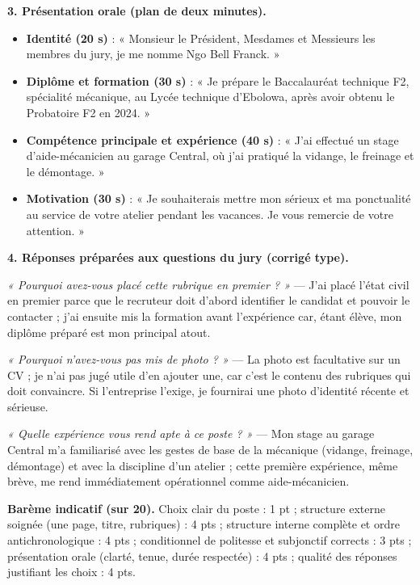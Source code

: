 \documentclass[11pt]{article}
\begin{document}
\begin{corrige}
\textbf{3. Présentation orale (plan de deux minutes).}
\begin{itemize}
\item \textbf{Identité (20 s)} : « Monsieur le Président, Mesdames et Messieurs les membres du jury, je me nomme Ngo Bell Franck. »
\item \textbf{Diplôme et formation (30 s)} : « Je prépare le Baccalauréat technique F2, spécialité mécanique, au Lycée technique d'Ebolowa, après avoir obtenu le Probatoire F2 en 2024. »
\item \textbf{Compétence principale et expérience (40 s)} : « J'ai effectué un stage d'aide-mécanicien au garage Central, où j'ai pratiqué la vidange, le freinage et le démontage. »
\item \textbf{Motivation (30 s)} : « Je souhaiterais mettre mon sérieux et ma ponctualité au service de votre atelier pendant les vacances. Je vous remercie de votre attention. »
\end{itemize}

\textbf{4. Réponses préparées aux questions du jury (corrigé type).}

\emph{« Pourquoi avez-vous placé cette rubrique en premier ? »} — J'ai placé l'état civil en premier parce que le recruteur doit d'abord identifier le candidat et pouvoir le contacter ; j'ai ensuite mis la formation avant l'expérience car, étant élève, mon diplôme préparé est mon principal atout.

\emph{« Pourquoi n'avez-vous pas mis de photo ? »} — La photo est facultative sur un CV ; je n'ai pas jugé utile d'en ajouter une, car c'est le contenu des rubriques qui doit convaincre. Si l'entreprise l'exige, je fournirai une photo d'identité récente et sérieuse.

\emph{« Quelle expérience vous rend apte à ce poste ? »} — Mon stage au garage Central m'a familiarisé avec les gestes de base de la mécanique (vidange, freinage, démontage) et avec la discipline d'un atelier ; cette première expérience, même brève, me rend immédiatement opérationnel comme aide-mécanicien.

\textbf{Barème indicatif (sur 20).} Choix clair du poste : 1 pt ; structure externe soignée (une page, titre, rubriques) : 4 pts ; structure interne complète et ordre antichronologique : 4 pts ; conditionnel de politesse et subjonctif corrects : 3 pts ; présentation orale (clarté, tenue, durée respectée) : 4 pts ; qualité des réponses justifiant les choix : 4 pts.
\end{corrige}
\end{document}
